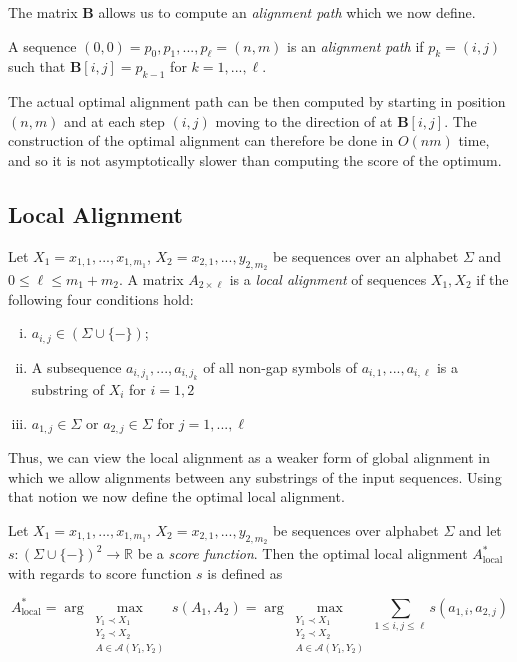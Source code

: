 The matrix \textbf{B} allows us to compute an \textit{alignment path} which we now define.

\begin{definition}
A sequence $(0, 0) = p_0,p_1, ..., p_{\ell} = (n, m)$ is an \textit{alignment path} if $p_{k} = (i, j)$ such that $\textbf{B}[i, j] = p_{k-1}$ for $k = 1, ..., \ell$.
\end{definition}

The actual optimal alignment path can be then computed by starting in position $(n, m)$ and at each step $(i, j)$ moving to the direction of at $\textbf{B}[i,j]$. The construction of the optimal alignment can therefore be done in $O(nm)$ time, and so it is not asymptotically slower than computing the score of the optimum. 

\subsection{Local Alignment}
\begin{definition}
Let $X_1 = x_{1,1},...,x_{1,m_1}$, $X_2 = x_{2,1}, ..., y_{2,m_2}$ be sequences over an alphabet $\Sigma$ and $0 \leq \ell \leq m_1+m_2$. A matrix $A_{2 \times \ell}$ is a \textit{local alignment} of sequences $X_1, X_2$ if the following four conditions hold:

\begin{enumerate}[(i)]
    \item $a_{i,j} \in (\Sigma \cup \{-\})$;
    \item A subsequence  $a_{i,j_1},...,a_{i,j_k}$ of all non-gap symbols of $a_{i,1},...,a_{i,\ell}$ is a substring of $X_i$ for $i=1,2$
    \item $a_{1, j} \in \Sigma$ or $a_{2, j} \in \Sigma$ for $j = 1,...,\ell$
\end{enumerate}
\end{definition}

Thus, we can view the local alignment as a weaker form of global alignment in which we allow alignments between any substrings of the input sequences. Using that notion we now define the optimal local alignment.

\begin{definition}
Let $X_1 = x_{1,1},...,x_{1,m_1}$, $X_2 = x_{2,1}, ..., y_{2,m_2}$ be sequences over alphabet $\Sigma$ and let $s: (\Sigma \cup \{-\})^2 \to \mathbb{R}$ be a \textit{score function}. Then the optimal local alignment $A_{\text{local}}^{\ast}$ with regards to score function $s$ is defined as

\begin{equation}
    A_{\text{local}}^{\ast} = \arg \max_{
        \substack{Y_1 \prec X_1 \\ Y_2 \prec X_2 \\ A \in \mathcal{A}(Y_1,Y_2)}
    } s(A_{1}, A_{2}) = \arg \max_{
        \substack{Y_1 \prec X_1 \\ Y_2 \prec X_2 \\ A \in \mathcal{A}(Y_1,Y_2)}
    } \sum_{1 \leq i,j \leq \ell} s(a_{1,i}, a_{2,j})
\end{equation}
\end{definition}

